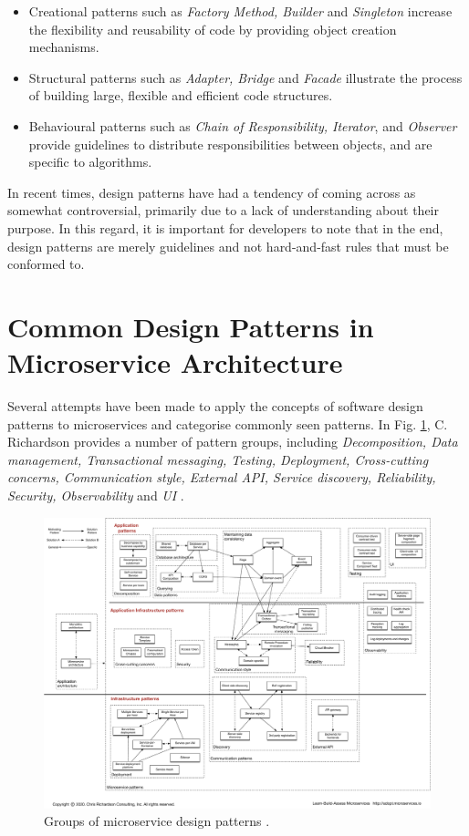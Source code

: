 \begin{itemize}
  \item Creational patterns such as \textit{Factory Method, Builder} and \textit{Singleton} increase the flexibility and reusability of code by providing object creation mechanisms.
  \item Structural patterns such as \textit{Adapter, Bridge} and \textit{Facade} illustrate the process of building large, flexible and efficient code structures.
  \item Behavioural patterns such as \textit{Chain of Responsibility, Iterator}, and \textit{Observer} provide guidelines to distribute responsibilities between objects, and are specific to algorithms.
\end{itemize}

In recent times, design patterns have had a tendency of coming across as somewhat controversial, primarily due to a lack of understanding about their purpose. In this regard, it is important for developers to note that in the end, design patterns are merely guidelines and not hard-and-fast rules that must be conformed to.

\section{Common Design Patterns in Microservice Architecture}

Several attempts have been made to  apply the concepts of software design patterns to microservices and categorise commonly seen patterns. In Fig. \ref{fig:richardson-patterns}, C. Richardson provides a number of pattern groups, including \textit{Decomposition, Data management, Transactional messaging, Testing, Deployment, Cross-cutting concerns, Communication style, External API, Service discovery, Reliability, Security, Observability} and \textit{UI} \cite{richardson-patterns}.

\begin{figure}[ht]
  \centering
  \includegraphics[width=1.0\linewidth]{./assets/images/related-work/richardson-patterns.pdf}
  \caption{Groups of microservice design patterns \cite{richardson-patterns}.}
  \label{fig:richardson-patterns}
\end{figure}

